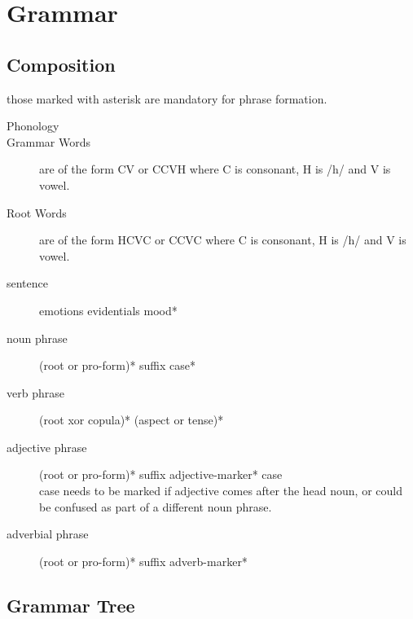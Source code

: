 \chapter{Grammar}
\section{Composition}
those marked with asterisk are mandatory for phrase formation.
\begin{description}
\item[Phonology]
\item[Grammar Words]
are of the form CV or CCVH where C is consonant, 
H is /h/ and V is vowel.
\item[Root Words]
are of the form HCVC or CCVC where C is consonant, 
H is /h/ and V is vowel.
\item[sentence]
emotions evidentials mood*
\item[noun phrase]
(root or pro-form)* suffix case*
\item[verb phrase]
(root xor copula)* (aspect or tense)*
\item[adjective phrase]
(root or pro-form)* suffix adjective-marker* case\\
case needs to be marked if adjective comes after the head noun,
or could be confused as part of a different noun phrase.
\item[adverbial phrase]
(root or pro-form)* suffix adverb-marker*
\end{description}
\section{Grammar Tree}

